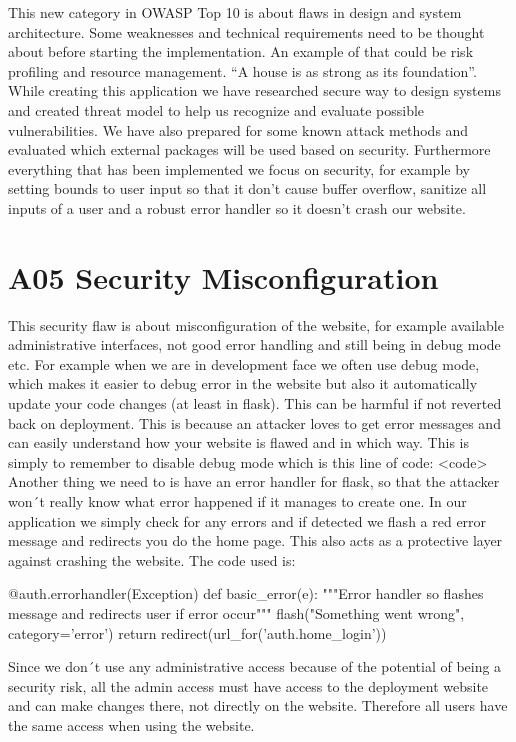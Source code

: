 This new category in OWASP Top 10 is about flaws in design and system architecture. Some weaknesses and technical requirements need to be thought about before starting the implementation. An example of that could be risk profiling and resource management. “A house is as strong as its foundation”. 
While creating this application we have researched secure way to design systems and created threat model to help us recognize and evaluate possible vulnerabilities. We have also prepared for some known attack methods and evaluated which external packages will be used based on security. Furthermore everything that has been implemented we focus on security, for example by setting bounds to user input so that it don’t cause buffer overflow, sanitize all inputs of a user and a robust error handler so it doesn’t crash our website. 

\section{A05 Security Misconfiguration}

This security flaw is about misconfiguration of the website, for example available administrative interfaces, not good error handling and still being in debug mode etc.
For example when we are in development face we often use debug mode, which makes it easier to debug error in the website but also it automatically update your code changes (at least in flask). This can be harmful if not reverted back on deployment. This is because an attacker loves to get error messages and can easily understand how your website is flawed and in which way.  This is simply to remember to disable debug mode which is this line of code: <code>
Another thing we need to is have an error handler for flask, so that the attacker won´t really know what error happened if it manages to create one. In our application we simply check for any errors and if detected we flash a red error message and redirects you do the home page. This also acts as a protective layer against crashing the website. The code used is:

\begin{python}
@auth.errorhandler(Exception)
def basic_error(e):
    """Error handler so flashes message
    and redirects user if error occur"""
    flash("Something went wrong", category='error')
    return redirect(url_for('auth.home_login'))
\end{python}

Since we don´t use any administrative access because of the potential of being a security risk, all the admin access must have access to the deployment website and can make changes there, not directly on the website. Therefore all users have the same access when using the website.


